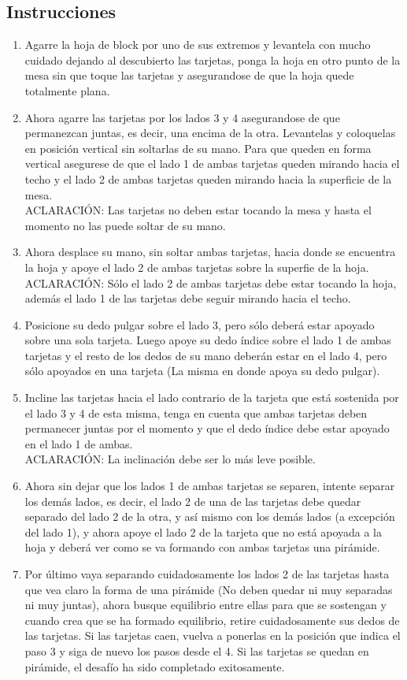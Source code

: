 \documentclass{article}
\begin{document}
\subsection{Instrucciones}
\begin{enumerate}
    \item Agarre la hoja de block por uno de sus extremos y levantela con mucho cuidado dejando al descubierto las tarjetas, ponga la hoja en otro punto de la mesa sin que toque las tarjetas y asegurandose de que la hoja quede totalmente plana.
    \item Ahora agarre las tarjetas por los lados 3 y 4 asegurandose de que permanezcan juntas, es decir, una encima de la otra. Levantelas y coloquelas en posición vertical sin soltarlas de su mano. Para que queden en forma vertical asegurese de que el lado 1 de ambas tarjetas queden mirando hacia el techo y el lado 2 de ambas tarjetas queden mirando hacia la superficie de la mesa.\\
    ACLARACIÓN: Las tarjetas no deben estar tocando la mesa y hasta el momento no las puede soltar de su mano.
    \item Ahora desplace su mano, sin soltar ambas tarjetas, hacia donde se encuentra la hoja y apoye el lado 2 de ambas tarjetas sobre la superfie de la hoja.\\
    ACLARACIÓN: Sólo el lado 2 de ambas tarjetas debe estar tocando la hoja, además el lado 1 de las tarjetas debe seguir mirando hacia el techo. 
    \item Posicione su dedo pulgar sobre el lado 3, pero sólo deberá estar apoyado sobre una sola tarjeta. Luego apoye su dedo índice sobre el lado 1 de ambas tarjetas y el resto de los dedos de su mano deberán estar en el lado 4, pero sólo apoyados en una tarjeta (La misma en donde apoya su dedo pulgar).
    \item Incline las tarjetas hacia el lado contrario de la tarjeta que está sostenida por el lado 3 y 4 de esta misma, tenga en cuenta que ambas tarjetas deben permanecer juntas por el momento y que el dedo índice debe estar apoyado en el lado 1 de ambas.\\
    ACLARACIÓN: La inclinación debe ser lo más leve posible.
    \item Ahora sin dejar que los lados 1 de ambas tarjetas se separen, intente separar los demás lados, es decir, el lado 2 de una de las tarjetas debe quedar separado del lado 2 de la otra, y así mismo con los demás lados (a excepción del lado 1), y ahora apoye el lado 2 de la tarjeta que no está apoyada a la hoja y deberá ver como se va formando con ambas tarjetas una pirámide.
    \item Por último vaya separando cuidadosamente los lados 2 de las tarjetas hasta que vea claro la forma de una pirámide (No deben quedar ni muy separadas ni muy juntas), ahora busque equilibrio entre ellas para que se sostengan y cuando crea que se ha formado equilibrio, retire cuidadosamente sus dedos de las tarjetas. Si las tarjetas caen, vuelva a ponerlas en la posición que indica el paso 3 y siga de nuevo los pasos desde el 4. Si las tarjetas se quedan en pirámide, el desafío ha sido completado exitosamente. 
\end{enumerate}
\end{document}
